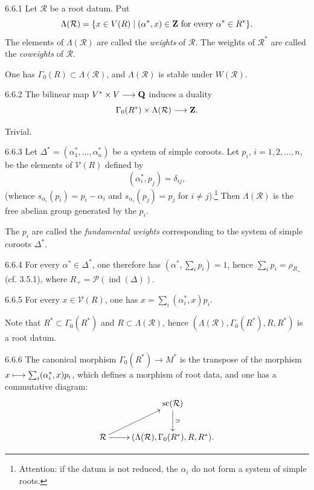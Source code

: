 \begin{definition}{6.6.1}\label{XXI.6.6.1}
Let $\mathcal R$ be a root datum. Put{\renewcommand{\thefootnote}{(26)}}
\[
\Lambda(\mathcal R)=\{x\in V(R)\mid(\alpha^*,x)\in\mathbf{Z}\text{ for every }\alpha^*\in R^*\}.
\]
The elements of $\Lambda(\mathcal R)$ are called the \emph{weights} of $\mathcal R$. The weights of $\mathcal R^*$ are called the \emph{coweights} of $\mathcal R$.
\end{definition}
One has $\Gamma_0(R)\subset\Lambda(\mathcal R)$, and $\Lambda(\mathcal R)$ is stable under $W(\mathcal R)$.
\begin{lemma}{6.6.2}\label{XXI.6.6.2}
The bilinear map $V^*\times V\longrightarrow\mathbf{Q}$ induces a duality
\[
\Gamma_0(R^*)\times\Lambda(\mathcal R)\longrightarrow\mathbf{Z}.
\]
\end{lemma}
Trivial.
\begin{corollary}{6.6.3}\label{XXI.6.6.3}
Let $\Delta^*=(\alpha_1^*,\ldots,\alpha_n^*)$ be a system of simple coroots. Let $p_i$, $i=1,2,\ldots,n$, be the elements of $\mathcal V(R)$ defined by
\[
(\alpha_i^*,p_j)=\delta_{ij},
\]
(whence $s_{\alpha_i}(p_i)=p_i-\alpha_i$ and $s_{\alpha_i}(p_j)=p_j$ for $i\ne j$).{\renewcommand{\thefootnote}{($*$)}\footnote{Attention: if the datum is not reduced, the $\alpha_i$ do not form a system of simple roots.}} Then $\Lambda(\mathcal R)$ is the free abelian group generated by the $p_i$.
\end{corollary}
The $p_i$ are called the \emph{fundamental weights} corresponding to the system of simple coroots $\Delta^*$.
\begin{corollary}{6.6.4}\label{XXI.6.6.4}
For every $\alpha^*\in\Delta^*$, one therefore has $(\alpha^*,\sum_i p_i)=1$, hence $\sum_i p_i=\rho_{R_+}$ (cf. 3.5.1), where $R_+=\mathcal P(\operatorname{ind}(\Delta))$.
\end{corollary}
\begin{corollary}{6.6.5}\label{XXI.6.6.5}
For every $x\in\mathcal V(R)$, one has $x=\sum_i(\alpha_i^*,x)p_i$.
\end{corollary}
Note that $R^*\subset\Gamma_0(R^*)$ and $R\subset\Lambda(\mathcal R)$, hence $(\Lambda(\mathcal R),\Gamma_0(R^*),R,R^*)$ is a root datum.
\begin{corollary}{6.6.6}\label{XXI.6.6.6}
The canonical morphism $\Gamma_0(R^*)\to M^*$ is the transpose of the morphism $x\longmapsto\sum_i(\alpha_i^*,x)p_i$, which defines a morphism of root data, and one has a commutative diagram:
\[
\xymatrix{&\operatorname{sc}(\mathcal R)\ar[d]^{\simeq}\\
\mathcal R\ar[ur]\ar[r]&(\Lambda(\mathcal R),\Gamma_0(R^*),R,R^*).}
\]
\end{corollary}
